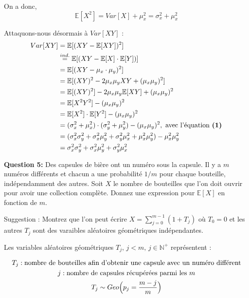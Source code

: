 \documentclass[10pt,a4paper]{article}
\begin{document}
	On a donc,
	\begin{equation}
		\mathbb{E}[X^2] = Var[X] + \mu_x^2 = \sigma^2_x + \mu_x^2
	\end{equation}

	\vspace{.3cm}
	Attaquons-nous désormais à $Var[XY]$ :
	\begin{align}
		Var[XY] &= \mathbb{E}[(XY - \mathbb{E}[XY])^2] \notag \\
		&\stackrel{ind.}{=} \mathbb{E}[(XY - \mathbb{E}[X] \cdot \mathbb{E}[Y])] \notag \\
		&= \mathbb{E}[(XY - \mu_x \cdot \mu_y)^2] \notag \\
		&= \mathbb{E}[(XY)^2 - 2\mu_x \mu_y XY + (\mu_x \mu_y)^2] \notag \\
		&= \mathbb{E}[(XY)^2] - 2\mu_x \mu_y \mathbb{E}[XY] + (\mu_x \mu_y)^2 \notag \\
		&= \mathbb{E}[X^2 Y^2] - (\mu_x \mu_y)^2 \notag \\
		&= \mathbb{E}[X^2] \cdot \mathbb{E}[Y^2] - (\mu_x \mu_y)^2 \notag \\
		&= (\sigma^2_x + \mu_x^2) \cdot (\sigma^2_y + \mu_y^2) - (\mu_x \mu_y)^2,\ \text{avec l'équation \textbf{(1)}} \notag \\
		&= (\sigma^2_x\sigma^2_y + \sigma^2_x\mu_y^2 + \sigma^2_y\mu_x^2 + \mu_x^2\mu_y^2) - \mu_x^2\mu_y^2 \notag \\
		&= \sigma^2_x\sigma^2_y + \sigma^2_x\mu_y^2 + \sigma^2_y\mu_x^2 \notag
	\end{align}

	\newpage
	\textbf{Question 5:} Des capsules de bière ont un numéro sous la capsule. Il y a $m$ numéros différents et chacun a une probabilité $1/m$ pour chaque bouteille, indépendamment des autres. Soit $X$ le nombre de bouteilles que l'on doit ouvrir pour avoir une collection complète. Donnez une expression pour $\mathbb{E}[X]$ en fonction de $m$. 
	
	\vspace{.1cm}
	Suggestion : Montrez que l'on peut écrire \(X = \sum_{j = 0}^{m - 1} (1 + T_j)\) où $T_0 = 0$ et les autres $T_j$ sont des varaibles aléatoires géométriques indépendantes.

	\vspace{.4cm}
	\noindent Les variables aléatoires géométriques $T_j,\, j < m,\, j \in \mathbb{N}^+$ représentent :
	
	\vspace{-.4cm}
	\begin{gather}
		T_j : \text{nombre de bouteilles afin d'obtenir une capsule avec un numéro différent} \notag \\
		j : \text{nombre de capsules récupérées parmi les } m \notag \\
		T_j \sim Geo\Big(p_j = \frac{m - j}{m}\Big) \notag
	\end{gather}
\end{document}
